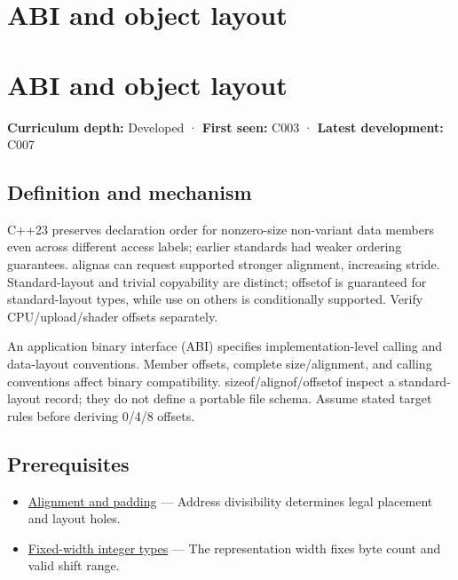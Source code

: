 \hypertarget{appendix-c4ac6bb0fff8}{}
\section*{ABI and object layout}
\section{ABI and object layout}\label{appendix-c4ac6bb0fff8-abi-and-object-layout}

\textbf{Curriculum depth:} Developed · \textbf{First seen:} C003 · \textbf{Latest development:} C007

\subsection{Definition and mechanism}\label{appendix-c4ac6bb0fff8-definition-and-mechanism}

C++23 preserves declaration order for nonzero-size non-variant data members even across different access labels; earlier standards had weaker ordering guarantees. alignas can request supported stronger alignment, increasing stride. Standard-layout and trivial copyability are distinct; offsetof is guaranteed for standard-layout types, while use on others is conditionally supported. Verify CPU/upload/shader offsets separately.

An application binary interface (ABI) specifies implementation-level calling and data-layout conventions. Member offsets, complete size/alignment, and calling conventions affect binary compatibility. sizeof/alignof/offsetof inspect a standard-layout record; they do not define a portable file schema. Assume stated target rules before deriving 0/4/8 offsets.

\subsection{Prerequisites}\label{appendix-c4ac6bb0fff8-prerequisites}

\begin{itemize}
\tightlist
\item
  \hyperref[appendix-a1f7c53b4742]{Alignment and padding} --- Address divisibility determines legal placement and layout holes.
\item
  \hyperref[appendix-cc04044b5782]{Fixed-width integer types} --- The representation width fixes byte count and valid shift range.
\end{itemize}

